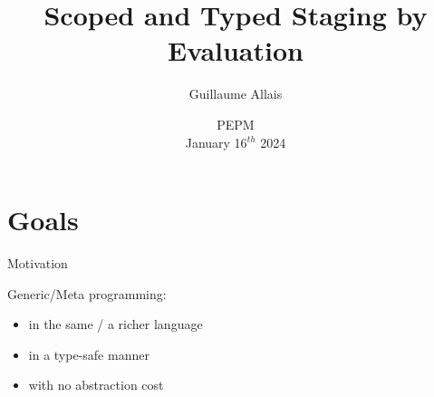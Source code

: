 \documentclass[aspectratio=169]{beamer}
\title{Scoped and Typed Staging by Evaluation}
\author{Guillaume Allais}
\institute{University of Strathclyde}
\date{PEPM \\ January 16$^{th}$ 2024}
\begin{document}
\begin{frame}
  \maketitle
\end{frame}

\section{Goals}

\begin{frame}{Motivation}



Generic/Meta programming:

\begin{itemize}
  \item in the same / a richer language
  \item in a type-safe manner
  \item with no abstraction cost
\end{itemize}
\end{frame}
\end{document}

